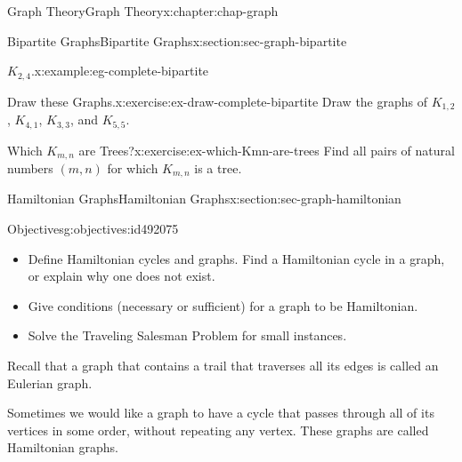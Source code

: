 \documentclass[oneside,10pt,]{book}
\numberwithin{equation}{section}
\begin{document}
\begin{chapterptx}{Graph Theory}{}{Graph Theory}{}{}{x:chapter:chap-graph}
\begin{sectionptx}{Bipartite Graphs}{}{Bipartite Graphs}{}{}{x:section:sec-graph-bipartite}
\begin{example}{\(K_{2,4}\).}{x:example:eg-complete-bipartite}
\begin{sidebyside}{1}{0.375}{0.375}{0}
\begin{sbspanel}{0.25}
{
}%
\end{sbspanel}%
\end{sidebyside}%
\end{example}
\begin{inlineexercise}{Draw these Graphs.}{x:exercise:ex-draw-complete-bipartite}%
Draw the graphs of \(K_{1,2}\), \(K_{4,1}\), \(K_{3,3}\), and \(K_{5,5}\).%
\end{inlineexercise}
\begin{inlineexercise}{Which \(K_{m,n}\) are Trees?}{x:exercise:ex-which-Kmn-are-trees}%
Find all pairs of natural numbers \((m,n)\) for which \(K_{m,n}\) is a tree.%
\end{inlineexercise}
\end{sectionptx}
%
%
\typeout{************************************************}
\typeout{************************************************}
%
\begin{sectionptx}{Hamiltonian Graphs}{}{Hamiltonian Graphs}{}{}{x:section:sec-graph-hamiltonian}
\begin{objectives}{Objectives}{g:objectives:id492075}
%
\begin{itemize}[label=\textbullet]
\item{}Define Hamiltonian cycles and graphs. Find a Hamiltonian cycle in a graph, or explain why one does not exist.%
\item{}Give conditions (necessary or sufficient) for a graph to be Hamiltonian.%
\item{}Solve the Traveling Salesman Problem for small instances.%
\end{itemize}
\end{objectives}
Recall that a graph that contains a trail that traverses all its edges is called an Eulerian graph.%
\par
Sometimes we would like a graph to have a cycle that passes through all of its vertices in some order, without repeating any vertex. These graphs are called Hamiltonian graphs.%

\end{sectionptx}
\end{chapterptx}
\end{document}
